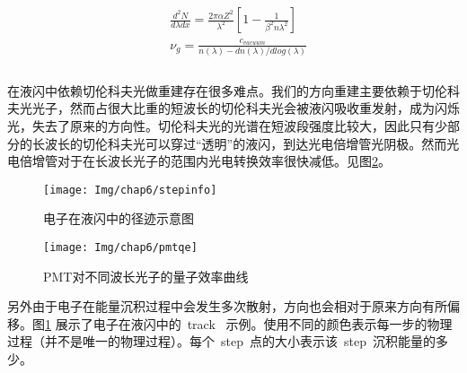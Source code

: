 \begin{equation}\label{eq:speed}
\begin{split}
&\frac{d^2N}{d\lambda dx}=\frac{2\pi\alpha Z^2}{\lambda^{2}}\left[1-\frac{1}{\beta^{2}n\lambda^{2}}\right]   \\
&\nu_g=\frac{c_{vacuum}}{n(\lambda)-dn(\lambda)/dlog(\lambda)}  \\
\end{split}
\end{equation}
\\
在液闪中依赖切伦科夫光做重建存在很多难点。我们的方向重建主要依赖于切伦科夫光光子，然而占很大比重的短波长的切伦科夫光会被液闪吸收重发射，成为闪烁光，失去了原来的方向性。切伦科夫光的光谱在短波段强度比较大，因此只有少部分的长波长的切伦科夫光可以穿过``透明''的液闪，到达光电倍增管光阴极。然而光电倍增管对于在长波长光子的范围内光电转换效率很快减低。见图\ref{fig:pmtqe}。
  \begin{figure}[!htb]
  \centering
   \texttt{[image: Img/chap6/stepinfo]}
    \caption{电子在液闪中的径迹示意图}
  \label{fig:stepinfo}
\end{figure}
\begin{figure}[!htb]
  \centering
   \texttt{[image: Img/chap6/pmtqe]}
    \caption{PMT对不同波长光子的量子效率曲线}
  \label{fig:pmtqe}
  \end{figure}
另外由于电子在能量沉积过程中会发生多次散射，方向也会相对于原来方向有所偏移。图\ref{fig:stepinfo} 展示了电子在液闪中的~track~ 示例。使用不同的颜色表示每一步的物理过程（并不是唯一的物理过程）。每个~step~点的大小表示该~step~沉积能量的多少。%



